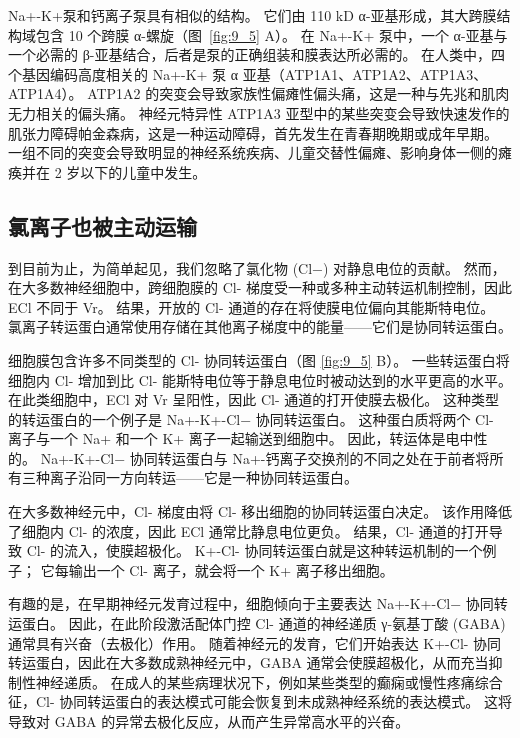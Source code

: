 Na+-K+泵和钙离子泵具有相似的结构。
它们由 110 kD α-亚基形成，其大跨膜结构域包含 10 个跨膜 α-螺旋（图~\ref{fig:9_5} A）。
在 Na+-K+ 泵中，一个 α-亚基与一个必需的 β-亚基结合，后者是泵的正确组装和膜表达所必需的。
在人类中，四个基因编码高度相关的 Na+-K+ 泵 α 亚基（ATP1A1、ATP1A2、ATP1A3、ATP1A4）。 ATP1A2 的突变会导致家族性偏瘫性偏头痛，这是一种与先兆和肌肉无力相关的偏头痛。
神经元特异性 ATP1A3 亚型中的某些突变会导致快速发作的肌张力障碍帕金森病，这是一种运动障碍，首先发生在青春期晚期或成年早期。
一组不同的突变会导致明显的神经系统疾病、儿童交替性偏瘫、影响身体一侧的瘫痪并在 2 岁以下的儿童中发生。



\subsection{氯离子也被主动运输}
到目前为止，为简单起见，我们忽略了氯化物 (Cl−) 对静息电位的贡献。 
然而，在大多数神经细胞中，跨细胞膜的 Cl- 梯度受一种或多种主动转运机制控制，因此 ECl 不同于 Vr。 
结果，开放的 Cl- 通道的存在将使膜电位偏向其能斯特电位。 
氯离子转运蛋白通常使用存储在其他离子梯度中的能量——它们是协同转运蛋白。


细胞膜包含许多不同类型的 Cl- 协同转运蛋白（图 \ref{fig:9_5} B）。 
一些转运蛋白将细胞内 Cl- 增加到比 Cl- 能斯特电位等于静息电位时被动达到的水平更高的水平。 
在此类细胞中，ECl 对 Vr 呈阳性，因此 Cl- 通道的打开使膜去极化。 
这种类型的转运蛋白的一个例子是 Na+-K+-Cl− 协同转运蛋白。 
这种蛋白质将两个 Cl- 离子与一个 Na+ 和一个 K+ 离子一起输送到细胞中。 
因此，转运体是电中性的。 
Na+-K+-Cl− 协同转运蛋白与 Na+-钙离子交换剂的不同之处在于前者将所有三种离子沿同一方向转运——它是一种协同转运蛋白。


在大多数神经元中，Cl- 梯度由将 Cl- 移出细胞的协同转运蛋白决定。 
该作用降低了细胞内 Cl- 的浓度，因此 ECl 通常比静息电位更负。 
结果，Cl- 通道的打开导致 Cl- 的流入，使膜超极化。 
K+-Cl- 协同转运蛋白就是这种转运机制的一个例子； 它每输出一个 Cl- 离子，就会将一个 K+ 离子移出细胞。


有趣的是，在早期神经元发育过程中，细胞倾向于主要表达 Na+-K+-Cl− 协同转运蛋白。 
因此，在此阶段激活配体门控 Cl- 通道的神经递质 γ-氨基丁酸 (GABA) 通常具有兴奋（去极化）作用。 
随着神经元的发育，它们开始表达 K+-Cl- 协同转运蛋白，因此在大多数成熟神经元中，GABA 通常会使膜超极化，从而充当抑制性神经递质。 
在成人的某些病理状况下，例如某些类型的癫痫或慢性疼痛综合征，Cl- 协同转运蛋白的表达模式可能会恢复到未成熟神经系统的表达模式。 
这将导致对 GABA 的异常去极化反应，从而产生异常高水平的兴奋。



